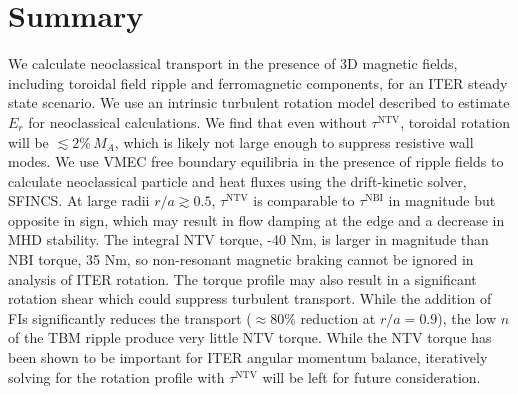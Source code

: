 \documentclass[aip, pop, preprint]{revtex4-1}
\numberwithin{figure}{section}
\numberwithin{equation}{section}
\begin{document}
\FloatBarrier

\section{Summary}\label{summary}

We calculate neoclassical transport in the presence of 3D magnetic fields, including toroidal field ripple and ferromagnetic components, for an ITER steady state scenario. We use an intrinsic turbulent rotation model described to estimate $E_r$ for neoclassical calculations. We find that even without $\tau^{\text{NTV}}$, toroidal rotation will be $\lesssim 2\% \,M_A$, which is likely not large enough to suppress resistive wall modes.\cite{Liu2004} We use VMEC free boundary equilibria in the presence of ripple fields to calculate neoclassical particle and heat fluxes using the drift-kinetic solver, SFINCS. At large radii $r/a \gtrsim 0.5$, $\tau^{\text{NTV}}$ is comparable to $\tau^{\text{NBI}}$ in magnitude but opposite in sign, which may result in flow damping at the edge and a decrease in MHD stability. The integral NTV torque, -40 Nm, is larger in magnitude than NBI torque, 35 Nm, so non-resonant magnetic braking cannot be ignored in analysis of ITER rotation. The torque profile may also result in a significant rotation shear which could suppress turbulent transport. While the addition of FIs significantly reduces the transport ($\approx 80\%$ reduction at $r/a = 0.9$), the low $n$ of the TBM ripple produce very little NTV torque. While the NTV torque has been shown to be important for ITER angular momentum balance, iteratively solving for the rotation profile with $\tau^{\text{NTV}}$ will be left for future consideration.

\appendix
\end{document}
